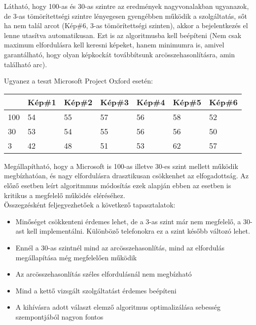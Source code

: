 Látható, hogy 100-as és 30-as szintre az eredmények nagyvonalakban ugyanazok, de 3-as tömörítettségi szintre lényegesen gyengébben működik a szolgáltatás, sőt ha nem talál arcot (Kép\#6, 3-as tömörítettségi szinten), akkor a bejelentkezés el lenne utasítva automatikusan. Ezt is az algoritmusba kell beépíteni (Nem csak maximum elfordulásra kell keresni képeket, hanem minimumra is, amivel garantálható, hogy olyan képkockát továbbítsunk arcösszehasonlításra, amin található arc).

Ugyanez a teszt Microsoft Project Oxford esetén:
\begin{center}
	\begin{tabular}{|p{2cm}|p{} |p{} | p{}|p{}|p{}|p{}|}
   	\hline
	 & Kép\#1 & Kép\#2& Kép\#3&Kép\#4 &Kép\#5 &Kép\#6\\ \hline
	100 & 54 & 55 &57 & 56 & 58 & 52 \\ \hline
	30 & 53 & 54 & 55 &56 & 56 & 50 \\ \hline
	3 & 42 & 48 & 51 & 53 & 62 & 57\\ \hline
	\end{tabular}
\end{center}

Megállapítható, hogy a Microsoft is 100-as illetve 30-es szint mellett működik megbízhatóan, és nagy elfordulásra drasztikusan csökkenhet az elfogadottság. Az előző esetben leírt algoritmmus módosítás ezek alapján ebben az esetben is kritikus a megfelelő működés eléréséhez.
\\Összegzésként feljegyezhetőek a következő tapasztalatok:
\begin{itemize}
\item Minőséget csökkenteni érdemes lehet, de a 3-as szint már nem megfelelő, a 30-ast kell implementálni. Különböző telefonokra ez a szint később változó lehet.
\item Ennél a 30-as szintnél mind az arcösszehasonlítás, mind az elfordulás megállapítása még megfelelően működik
\item Az arcösszehasonlítás széles elfordulásnál nem megbízható
\item Mind a kettő vizsgált szolgáltatást érdemes beépíteni
\item A kihívásra adott választ elemző algoritmus optimalizálása sebesség szempontjából nagyon fontos
\end{itemize}

